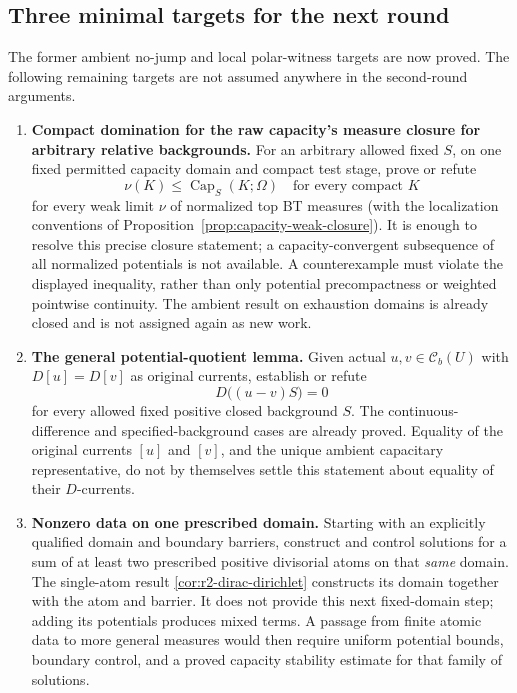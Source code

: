 \documentclass[11pt,a4paper]{article}
\numberwithin{equation}{section}
\theoremstyle{definition}
\theoremstyle{remark}
\newcommand{\Cb}{\mathcal C_b}
\begin{document}
\subsection{Three minimal targets for the next round}

The former ambient no-jump and local polar-witness targets are now
proved. The following remaining targets are not assumed anywhere in
the second-round arguments.

\begin{enumerate}
\item \textbf{Compact domination for the raw capacity's measure
closure for arbitrary relative backgrounds.} For an arbitrary allowed
fixed $S$, on one fixed permitted capacity domain and compact test
stage, prove or refute
\[
 \nu(K)\leq\operatorname{Cap}_S(K;\Omega)
 \quad\text{for every compact }K
\]
for every weak limit $\nu$ of normalized top BT measures (with the
localization conventions of
Proposition~\ref{prop:capacity-weak-closure}). It is enough to resolve
this precise closure statement; a capacity-convergent subsequence of
all normalized potentials is not available. A counterexample must
violate the displayed inequality, rather than only potential
precompactness or weighted pointwise continuity. The ambient result
on exhaustion domains is already closed and is not assigned again
as new work.

\item \textbf{The general potential-quotient lemma.} Given actual
$u,v\in\Cb(U)$ with $D[u]=D[v]$ as original currents, establish
or refute
\[
 D\bigl((u-v)S\bigr)=0
\]
for every allowed fixed positive closed background $S$.
The continuous-difference and specified-background cases are already
proved. Equality of the original currents $[u]$ and $[v]$, and the
unique ambient capacitary representative, do not by themselves
settle this statement about equality of their $D$-currents.

\item \textbf{Nonzero data on one prescribed domain.} Starting with
an explicitly qualified domain and boundary barriers, construct and
control solutions for a sum of at least two prescribed positive
divisorial atoms on that \emph{same} domain. The single-atom result
\ref{cor:r2-dirac-dirichlet} constructs its domain together with the
atom and barrier. It does not provide this next fixed-domain step;
adding its potentials produces mixed terms. A passage from finite
atomic data to more general measures would then require uniform
potential bounds, boundary control, and a proved capacity stability
estimate for that family of solutions.
\end{enumerate}
\end{document}
